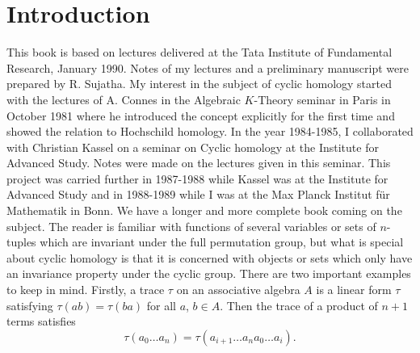 

\chapter{Introduction}


This book is based on lectures delivered at the Tata Institute of
Fundamental Research, January 1990. Notes of my lectures and a
preliminary manuscript were prepared by R. Sujatha. My interest in the
subject of cyclic homology started with the lectures of A. Connes in
the Algebraic $K$-Theory seminar in Paris in October 1981 where he
introduced the concept explicitly for the first time and showed the
relation to Hochschild homology. In the year 1984-1985, I collaborated
with Christian Kassel on a seminar on Cyclic homology at the Institute
for Advanced Study. Notes were made on the lectures given in this
seminar. This project was carried further in 1987-1988 while Kassel
was at the Institute for Advanced Study and in 1988-1989 while I was
at the Max Planck Institut f\"ur Mathematik in Bonn. We have a longer
and more complete book coming on the subject. The reader is familiar
with functions of several variables or sets of $n$-tuples which are
invariant under the full permutation group, but what is special about
cyclic homology is that it is concerned with objects or sets which
only have an invariance property under the cyclic group. There are two
important examples to keep in mind. Firstly, a trace $\tau$ on an
associative algebra $A$ is a linear form $\tau$ satisfying
$\tau(ab)=\tau(ba)$ for all $a$, $b\in A$. Then the trace of a product
of $n+1$ terms satisfies
$$
\tau(a_{0}\ldots a_{n})=\tau(a_{i+1}\ldots a_{n}a_{0}\ldots a_{i}).
$$

